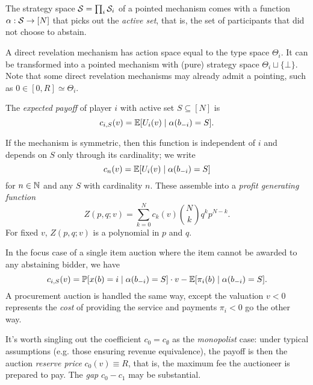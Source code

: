 The strategy space $\mathcal{S}=\prod_i\mathcal{S}_i$ of a pointed mechanism comes with a function $\alpha:\mathcal{S}\rightarrow[N]$ that picks out the \emph{active set}, that is, the set of participants that did not choose to abstain.

\begin{example}

  A direct revelation mechanism has action space equal to the type space $\Theta_i$.
  It can be transformed into a pointed mechanism with (pure) strategy space $\Theta_i\sqcup\{\bot\}$.
  Note that some direct revelation mechanisms may already admit a pointing, such as $0\in [0,R]\simeq\Theta_i$.

\end{example}


\begin{definition}

  The \emph{expected payoff} of player $i$ with active set $S\subseteq[N]$ is
  \[
    c_{i,S}(v) = \mathbb{E}[U_i(v) \mid \alpha(b_{-i})=S].
  \]

  If the mechanism is symmetric, then this function is independent of $i$ and depends on $S$ only through its cardinality; we write
  \[
    c_{n}(v) = \mathbb{E}[U_i(v) \mid \alpha(b_{-i})=S]
  \]
  for $n\in\mathbb{N}$ and any $S$ with cardinality $n$.
  These assemble into a \emph{profit generating function}
  \[
    Z(p,q;v) = \sum_{k=0}^N c_{k}(v){N\choose k} q^kp^{N-k}.
  \]
  For fixed $v$, $Z(p,q;v)$ is a polynomial in $p$ and $q$.
  
\end{definition}

\begin{example}

  In the focus case of a single item auction where the item cannot be awarded to any abstaining bidder, we have
  \[
    c_{i,S}(v) = \mathbb{P}[x(b)=i\mid \alpha(b_{-i})=S]\cdot v - \mathbb{E}[\pi_i(b)\mid \alpha(b_{-i})=S].
  \]
  A procurement auction is handled the same way, except the valuation $v<0$ represents the \emph{cost} of providing the service and payments $\pi_i<0$ go the other way.

\end{example}

It's worth singling out the coefficient $c_0=c_\emptyset$ as the \emph{monopolist} case: under typical assumptions (e.g. those ensuring revenue equivalence), the payoff is then the auction \emph{reserve price} $c_0(v)\equiv R$, that is, the maximum fee the auctioneer is prepared to pay.
%
The \emph{gap} $c_0-c_1$ may be substantial.

